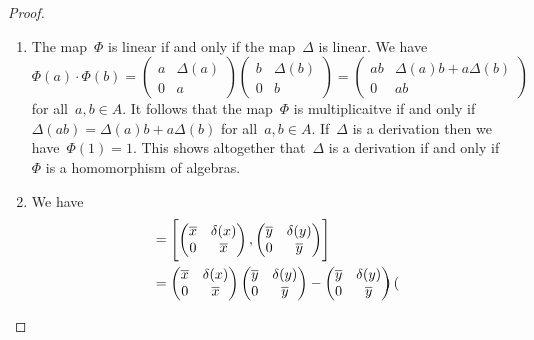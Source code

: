 \begin{proof}
	\leavevmode
	\begin{enumerate}
		\item
			The map~$\Phi$ is linear if and only if the map~$\Delta$ is linear.
			We have
			\[
				\Phi(a) \cdot \Phi(b)
				=
				\begin{pmatrix}
					a & \Delta(a) \\
					0 & a
				\end{pmatrix}
				\begin{pmatrix}
					b & \Delta(b) \\
					0 & b
				\end{pmatrix}
				=
				\begin{pmatrix}
					ab  & \Delta(a) b + a \Delta(b) \\
					0   & ab
				\end{pmatrix}
			\]
			for all~$a, b \in A$.
			It follows that the map~$\Phi$ is multiplicaitve if and only if~$\Delta(ab) = \Delta(a) b + a \Delta(b)$ for all~$a, b \in A$.
			If~$\Delta$ is a derivation then we have~$\Phi(1) = 1$.
			This shows altogether that~$\Delta$ is a derivation if and only if~$\Phi$ is a homomorphism of algebras.
		\item
			We have
			\begin{align*}
				[ \varphi(x), \varphi(y) ]
				&=
				\Biggl[
					\begin{pmatrix}
						\class{x} & \delta(x) \\
						0         & \class{x}
					\end{pmatrix},
					\begin{pmatrix}
						\class{y} & \delta(y) \\
						0         & \class{y}
					\end{pmatrix}
				\Biggr]
				\\
				&=
				\begin{pmatrix}
					\class{x} & \delta(x) \\
					0         & \class{x}
				\end{pmatrix}
				\begin{pmatrix}
					\class{y} & \delta(y) \\
					0         & \class{y}
				\end{pmatrix}
				-
				\begin{pmatrix}
					\class{y} & \delta(y) \\
					0         & \class{y}
				\end{pmatrix}
				\begin{pmatrix}

\end{pmatrix}
\end{align*}
\end{enumerate}
\end{proof}
